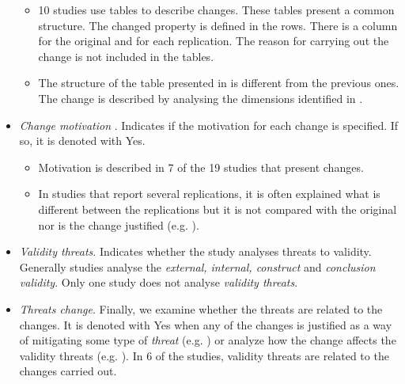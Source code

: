 \begin{itemize}
\begin{itemize}
        \item 10 studies use tables to describe changes. These tables present a common structure. The changed property is defined in the rows. There is a column for the original and for each replication. The reason for carrying out the change is not included in the tables.
    
        \item The structure of the table presented in \cite{de2017influence} is different from the previous ones. The change is described by analysing the dimensions identified in \cite{gomez2014understanding}.
        \\
       
        
    \end{itemize}      
        
        \item \emph{Change motivation }. Indicates if the motivation for each change is specified. If so, it is denoted with Yes.
        
        \begin{itemize}
            \item Motivation is described in 7 of the 19 studies that present changes.
        
            \item In studies that report several replications, it is often explained what is different between the replications but it is not compared with the original nor is the change justified (e.g. \cite{santos2019comparing}). \\
        \end{itemize}
    
    \item \emph{Validity threats}. Indicates whether the study analyses threats to validity. Generally studies analyse the \emph{external, internal, construct} and \emph{conclusion validity}. Only one study does not analyse \emph{validity threats}.\\
    
    \item \emph{Threats change}. Finally, we examine whether the threats are related to the changes.
    It is denoted with Yes when any of the changes is justified as a way of mitigating some type of \emph{threat} (e.g. \cite{kosar2018program}) or analyze how the change affects the validity threats (e.g. \cite{albayrak2014investigation}).
    In 6 of the studies, validity threats are related to the changes carried out.
    
\end{itemize} 

